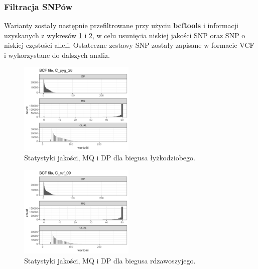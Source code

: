 \documentclass[a4paper, 12pt]{article}
\begin{document}
\subsubsection{Filtracja SNPów}
Warianty zostały następnie przefiltrowane przy użyciu \textbf{bcftools} i informacji uzyskanych z wykresów \ref{fig:qualmqdp_pyg} i \ref{fig:qualmqdp_ruf}, w celu usunięcia niskiej jakości SNP oraz SNP o niskiej częstości alleli. Ostateczne zestawy SNP zostały zapisane w formacie VCF i wykorzystane do dalszych analiz.

\begin{figure}[H]
    \centering
    \includegraphics[width=0.49\textwidth]{img/Stats_QualMQDP_C_pyg_26.png}
    \caption{Statystyki jakości, MQ i DP dla biegusa łyżkodziobego.}
    \label{fig:qualmqdp_pyg}
\end{figure}
\hfill
\begin{figure}[H]
    \centering
    \includegraphics[width=0.49\textwidth]{img/Stats_QualMQDP_C_ruf_09.png}
    \caption{Statystyki jakości, MQ i DP dla biegusa rdzawoszyjego.}
    \label{fig:qualmqdp_ruf}
\end{figure}
\end{document}
